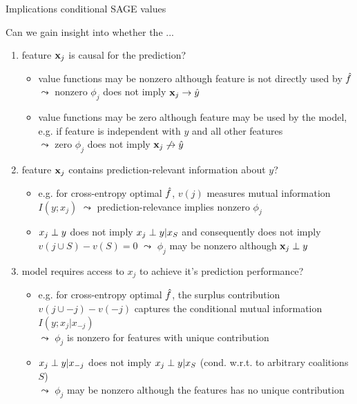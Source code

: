 \documentclass[11pt,compress,t,notes=noshow, aspectratio=169, xcolor=table]{beamer}
\begin{document}
\begin{frame}{Implications conditional SAGE values}

Can we gain insight into whether the ...

\begin{enumerate}
    \item<1> feature $\xj$ is causal for the prediction?
    \begin{itemize}
      \item value functions may be nonzero although feature is not directly used by $\fh$\\
      $\leadsto$ nonzero $\phi_j$ does not imply $\xj \rightarrow \hat{y}$
      \item value functions may be zero although feature may be used by the model, e.g. if feature is independent with $y$ and all other features \\ $\leadsto$ zero $\phi_j$ does not imply $\xj \not \rightarrow \hat{y}$
    \end{itemize}
    \item<2> feature $\xj$ contains prediction-relevant information about $y$?
    \begin{itemize}
      \item e.g. for cross-entropy optimal $\fh$, $v(j)$ measures mutual information $I(y;x_j)$
      $\leadsto$ prediction-relevance implies nonzero $\phi_j$
      \item $x_j \indep y$ does not imply $x_j \indep y | x_S$ and consequently does not imply $v(j \cup S) - v(S) = 0$
      $\leadsto$ $\phi_j$ may be nonzero although $\xj \indep y$
    \end{itemize}
    \item<3> model requires access to $x_j$ to achieve it's prediction performance?  
    \begin{itemize}
        \item e.g. for cross-entropy optimal $\fh$, the surplus contribution $v(j \cup -j) - v(-j)$ captures the conditional mutual information $I(y;x_j|x_{-j})$\\
        $\leadsto$ $\phi_j$ is nonzero for features with unique contribution
        \item $x_j \indep y | x_{-j}$ does not imply $x_j \indep y | x_S$ (cond. w.r.t. to arbitrary coalitions $S$)\\
        $\leadsto$ $\phi_j$ may be nonzero although the features has no unique contribution
    \end{itemize}
\end{enumerate}

\end{frame}
\end{document}
